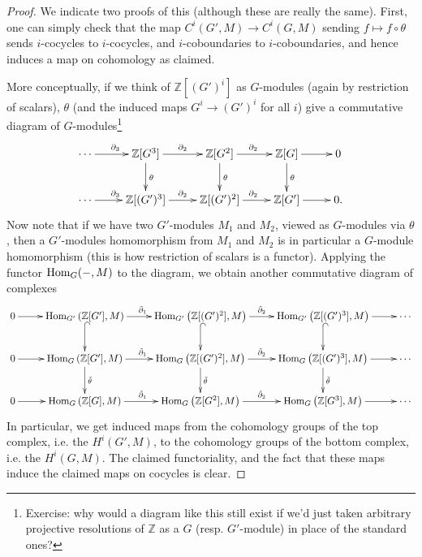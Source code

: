 \documentclass[11pt]{amsart}
\numberwithin{equation}{section}
\theoremstyle{remark}
\theoremstyle{remark}
\theoremstyle{remark}
\theoremstyle{definition}
\theoremstyle{definition}
\theoremstyle{definition}
\theoremstyle{definition}
\theoremstyle{definition}
\theoremstyle{definition}
\begin{document}
\begin{proof}
We indicate two proofs of this (although these are really the same). First, one can simply check that the map $C^i(G',M)\rightarrow C^i(G,M)$ sending $f\mapsto f\circ \theta$ sends $i$-cocycles to $i$-cocycles, and $i$-coboundaries to $i$-coboundaries, and hence induces a map on cohomology as claimed.

 More conceptually, if we think of $\mathbb{Z}[(G')^i]$ as $G$-modules (again by restriction of scalars), $\theta$ (and the induced maps $G^i\rightarrow (G')^i$ for all $i$) give a commutative diagram of $G$-modules\footnote{Exercise: why would a diagram like this still exist if we'd just taken arbitrary projective resolutions of $\mathbb{Z}$ as a $G$ (resp. $G'$-module) in place of the standard ones?}
\[\xymatrix{\cdots\ar[r]^{\partial_3}&\mathbb{Z}[G^3]\ar[r]^{\partial_{2}}\ar[d]^\theta&\mathbb{Z}[G^2]\ar[r]^{\partial_2}\ar[d]^\theta&\mathbb{Z}[G]\ar[r]\ar[d]^\theta&0\\
\cdots\ar[r]^{\partial_3}&\mathbb{Z}[(G')^3]\ar[r]^{\partial_{2}}&\mathbb{Z}[(G')^2]\ar[r]^{\partial_2}&\mathbb{Z}[G']\ar[r]&0.}\]
Now note that if we have two $G'$-modules $M_1$ and $M_2$, viewed as $G$-modules via $\theta$, then a $G'$-modules homomorphism from $M_1$ and $M_2$ is in particular a $G$-module homomorphism (this is how restriction of scalars is a functor). Applying the functor $\textup{Hom}_G(-,M)$ to the diagram, we obtain another commutative diagram of complexes
\[
\xymatrix{0\ar[r]&\textup{Hom}_{G'}\left(\mathbb{Z}[G'],M\right)\ar[r]^{\tilde{\partial}_1}\ar@{^{(}->}[d]&\textup{Hom}_{G'}\left(\mathbb{Z}[(G')^2],M\right)\ar[r]^{\tilde{\partial}_2}\ar@{^{(}->}[d]& \textup{Hom}_{G'}\left(\mathbb{Z}[(G')^3],M\right)\ar[r]\ar@{^{(}->}[d]&\cdots\\0\ar[r]&\textup{Hom}_{G}\left(\mathbb{Z}[G'],M\right)\ar[r]^{\tilde{\partial}_1}\ar[d]^{\tilde{\theta}}&\textup{Hom}_{G}\left(\mathbb{Z}[(G')^2],M\right)\ar[r]^{\tilde{\partial}_2}\ar[d]^{\tilde{\theta}}& \textup{Hom}_{G}\left(\mathbb{Z}[(G')^3],M\right)\ar[r]\ar[d]^{\tilde{\theta}}&\cdots \\ 0\ar[r]&\textup{Hom}_{G}\left(\mathbb{Z}[G],M\right)\ar[r]^{\tilde{\partial}_1}&
\textup{Hom}_{G}\left(\mathbb{Z}[G^2],M\right)\ar[r]^{\tilde{\partial}_2} &\textup{Hom}_{G}\left(\mathbb{Z}[G^3],M\right)\ar[r]&\cdots}
\] 
In particular, we get induced maps from the cohomology groups of the top complex, i.e. the $H^i(G',M)$, to the cohomology groups of the bottom complex, i.e. the $H^i(G,M)$. The claimed functoriality, and the fact that these maps induce the claimed maps on cocycles is clear. 
\end{proof}
\end{document}
